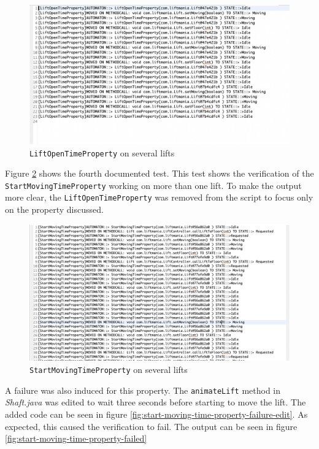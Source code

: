 \documentclass[a4paper, 12pt]{article}
\begin{document}
\begin{figure}[h]
   \centering
   \includegraphics[width=\textwidth,height=\textheight,keepaspectratio]{images/lift-open-test-multiple} %
   \caption{\texttt{LiftOpenTimeProperty} on several lifts}
   \label{fig:lift-open-test-multiple}
\end{figure}

Figure \ref{fig:start-moving-time-property-several} shows the fourth documented test. This test shows the verification of the \texttt{StartMovingTimeProperty} working on more than one lift. To make the output more clear, the \texttt{LiftOpenTimeProperty} was removed from the script to focus only on the property discussed. \\
\begin{figure}[h]
   \centering
   \includegraphics[width=\textwidth,height=\textheight,keepaspectratio]{images/start-moving-time-property-several} %
   \caption{\texttt{StartMovingTimeProperty} on several lifts}
   \label{fig:start-moving-time-property-several}
\end{figure}

A failure was also induced for this property. The \texttt{animateLift} method in \textit{Shaft.java} was edited to wait three seconds before starting to move the lift. The added code can be seen in figure \ref{fig:start-moving-time-property-failure-edit}. As expected, this caused the verification to fail. The output can be seen in figure \ref{fig:start-moving-time-property-failed}
\end{document}
